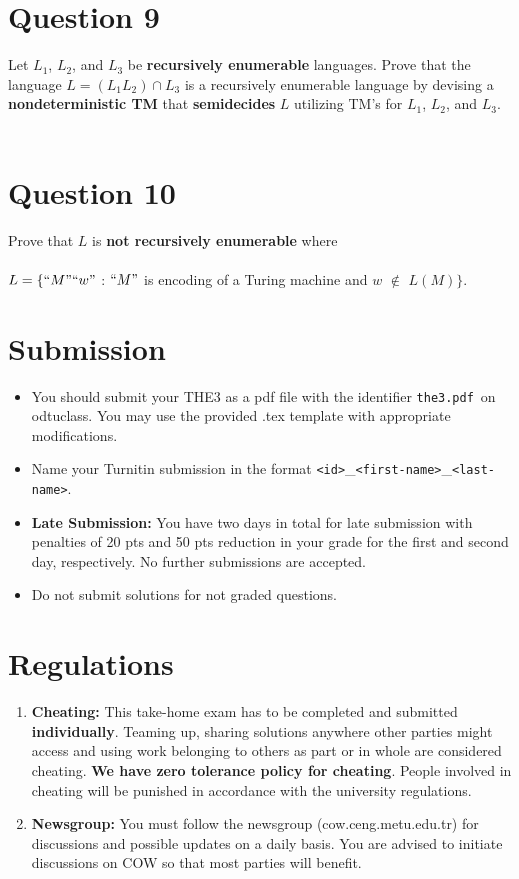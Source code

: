 \documentclass[fleqn,12pt]{article}
\begin{document}
\section*{Question 9 \hfill {}} 
Let $L_1$, $L_2$, and $L_3$ be \textbf{recursively enumerable} languages. Prove that the language $L = (L_1L_2)\cap L_3$ is a recursively enumerable language by devising a \textbf{nondeterministic TM} that \textbf{semidecides} $L$ utilizing TM's for $L_1$, $L_2$, and $L_3$. 
\noindent\\\\

\section*{Question 10 \hfill {}} 
Prove that $L$ is \textbf{not recursively enumerable} where
\\
\\
$L = \{``M"``w"$ : $``M"$ is encoding of a Turing machine and $w$ $\not \in$ $L(M)\}.$
\pagebreak

\section*{Submission}
\begin{itemize}
\item You should submit your THE3 as a pdf file with the identifier \textquotesingle \texttt{the3.pdf}\textquotesingle \, on odtuclass. You may use the provided .tex template with appropriate modifications.
\item Name your Turnitin submission in the format \texttt{<id>}\_\texttt{<first-name>}\_\texttt{<last-name>}.
\item \textbf{Late Submission:} You have two days in total for late submission with penalties of 20 pts and 50 pts reduction in your grade for the first and second day, respectively.  No further submissions are accepted.
\item Do not submit solutions for not graded questions.
\end{itemize}
\noindent

\section*{Regulations}
\begin{enumerate}  
\item \textbf{Cheating:} This take-home exam has to be completed and submitted \textbf{individually}. Teaming up, sharing solutions anywhere other parties might access and using work belonging to others as part or in whole are considered cheating. \textbf{We have zero tolerance policy for cheating}. People involved in cheating will be punished in accordance with the university regulations.
\item \textbf{Newsgroup:} You must follow the newsgroup (cow.ceng.metu.edu.tr) for discussions and possible updates on a daily basis. You are advised to initiate discussions on COW so that most parties will benefit. 
\end{enumerate}
\end{document}
